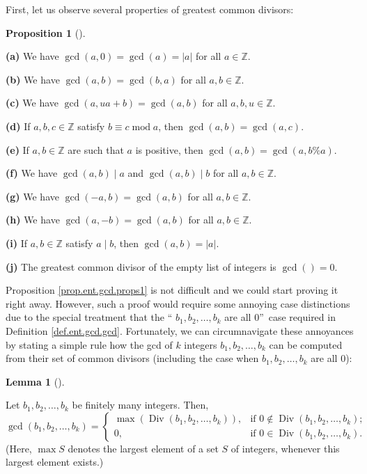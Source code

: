\documentclass[numbers=enddot,12pt,final,onecolumn,notitlepage]{scrartcl}%
\numberwithin{exer}{subsection}
\theoremstyle{definition}
\newtheorem{lem}[theo]{Lemma}
\newenvironment{lemma}[1][]
{\begin{lem}[#1]\begin{leftbar}}
{\end{leftbar}\end{lem}}
\newtheorem{prop}[theo]{Proposition}
\newenvironment{proposition}[1][]
{\begin{prop}[#1]\begin{leftbar}}
{\end{leftbar}\end{prop}}
\begin{document}
First, let us observe several properties of greatest common divisors:

\begin{proposition}
\label{prop.ent.gcd.props1}\textbf{(a)} We have $\gcd\left(  a,0\right)
=\gcd\left(  a\right)  =\left\vert a\right\vert $ for all $a\in\mathbb{Z}$.

\textbf{(b)} We have $\gcd\left(  a,b\right)  =\gcd\left(  b,a\right)  $ for
all $a,b\in\mathbb{Z}$.

\textbf{(c)} We have $\gcd\left(  a,ua+b\right)  =\gcd\left(  a,b\right)  $
for all $a,b,u\in\mathbb{Z}$.

\textbf{(d)} If $a,b,c\in\mathbb{Z}$ satisfy $b\equiv c\operatorname{mod}a$,
then $\gcd\left(  a,b\right)  =\gcd\left(  a,c\right)  $.

\textbf{(e)} If $a,b\in\mathbb{Z}$ are such that $a$ is positive, then
$\gcd\left(  a,b\right)  =\gcd\left(  a,b\%a\right)  $.

\textbf{(f)} We have $\gcd\left(  a,b\right)  \mid a$ and $\gcd\left(
a,b\right)  \mid b$ for all $a,b\in\mathbb{Z}$.

\textbf{(g)} We have $\gcd\left(  -a,b\right)  =\gcd\left(  a,b\right)  $ for
all $a,b\in\mathbb{Z}$.

\textbf{(h)} We have $\gcd\left(  a,-b\right)  =\gcd\left(  a,b\right)  $ for
all $a,b\in\mathbb{Z}$.

\textbf{(i)} If $a,b\in\mathbb{Z}$ satisfy $a\mid b$, then $\gcd\left(
a,b\right)  =\left\vert a\right\vert $.

\textbf{(j)} The greatest common divisor of the empty list of integers is
$\gcd\left(  {}\right)  =0$.
\end{proposition}

Proposition \ref{prop.ent.gcd.props1} is not difficult and we could start
proving it right away. However, such a proof would require some annoying case
distinctions due to the special treatment that the \textquotedblleft%
$b_{1},b_{2},\ldots,b_{k}$ are all $0$\textquotedblright\ case required in
Definition \ref{def.ent.gcd.gcd}. Fortunately, we can circumnavigate these
annoyances by stating a simple rule how the gcd of $k$ integers $b_{1}%
,b_{2},\ldots,b_{k}$ can be computed from their set of common divisors
(including the case when $b_{1},b_{2},\ldots,b_{k}$ are all $0$):

\begin{lemma}
\label{lem.ent.gcd.through-Div}Let $b_{1},b_{2},\ldots,b_{k}$ be finitely many
integers. Then,%
\[
\gcd\left(  b_{1},b_{2},\ldots,b_{k}\right)  =%
\begin{cases}
\max\left(  \operatorname*{Div}\left(  b_{1},b_{2},\ldots,b_{k}\right)
\right)  , & \text{if }0\notin\operatorname*{Div}\left(  b_{1},b_{2}%
,\ldots,b_{k}\right)  ;\\
0, & \text{if }0\in\operatorname*{Div}\left(  b_{1},b_{2},\ldots,b_{k}\right)
.
\end{cases}
\]
(Here, $\max S$ denotes the largest element of a set $S$ of integers, whenever
this largest element exists.)
\end{lemma}
\end{document}
